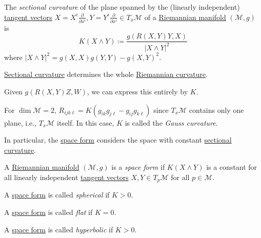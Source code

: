 \begin{definition}\label{def:sectional-curvature}
	The \emph{sectional curvature} of the plane spanned by the (linearly independent) \hyperref[def:tangent-vector]{tangent vectors} \(X = X^i \frac{\partial }{\partial x^i} , Y= Y^i \frac{\partial }{\partial x^i} \in T_x \mathcal{M} \) of a \hyperref[def:Riemannian-manifold]{Riemannian manifold} \((\mathcal{M}, g)\) is
	\[
		K(X \wedge Y) \coloneqq \frac{g(R(X, Y) Y, X)}{\vert X\wedge Y \vert^2 }
	\]
	where \(\vert X \wedge Y \vert ^2 = g(X, X) g(Y, Y) - g(X, Y)^2\).
\end{definition}

\begin{remark}
	\hyperref[def:sectional-curvature]{Sectional curvature} determines the whole \hyperref[def:Riemannian-curvature]{Riemannian curvature}.
\end{remark}
\begin{explanation}
	Given \(g(R(X, Y)Z, W)\), we can express this entirely by \(K\).
\end{explanation}

\begin{remark}
	For \(\dim \mathcal{M} = 2\), \(R_{ijk\ell} = K(g_{ik} g_{j \ell } - g_{ij} g_{k \ell })\) since \(T_x \mathcal{M} \) contains only one plane, i.e., \(T_x \mathcal{M} \) itself. In this case, \(K\) is called the \emph{Gauss curvature}.
\end{remark}

In particular, the \hyperref[def:space-form]{space form} considers the space with constant \hyperref[def:sectional-curvature]{sectional curvature}.

\begin{definition}\label{def:space-form}
	A \hyperref[def:Riemannian-manifold]{Riemannian manifold} \((\mathcal{M} , g)\) is a \emph{space form} if \(K(X\wedge Y) \) is a constant for all linearly independent \hyperref[def:tangent-vector]{tangent vectors} \(X, Y\in T_p \mathcal{M} \) for all \(p\in \mathcal{M} \).

	\begin{definition}[Spherical]\label{def:space-form-spherical}
		A \hyperref[def:space-form]{space form} is called \emph{spherical} if \(K > 0\).
	\end{definition}

	\begin{definition}[Flat]\label{def:space-form-flat}
		A \hyperref[def:space-form]{space form} is called \emph{flat} if \(K = 0\).
	\end{definition}

	\begin{definition}[Hyperbolic]\label{def:space-form-hyperbolic}
		A \hyperref[def:space-form]{space form} is called \emph{hyperbolic} if \(K > 0\).
	\end{definition}
\end{definition}

